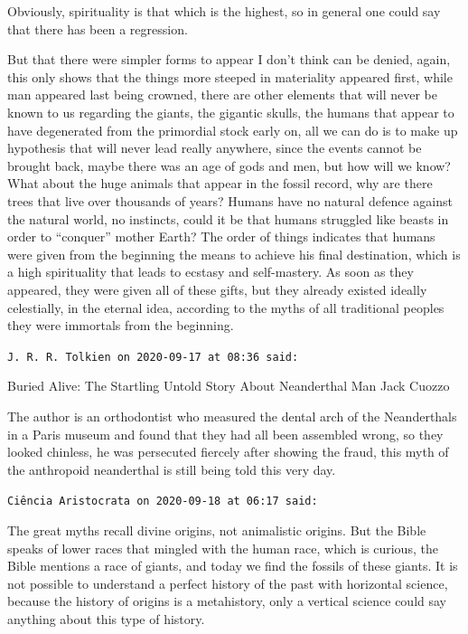 \begin{footnotesize}
\begin{sffamily}
Obviously, spirituality is that which is the highest, so in general one could say that there has been a regression.

But that there were simpler forms to appear I don't think can be denied, again, this only shows that the things more steeped in materiality appeared first, while man appeared last being crowned, there are other elements that will never be known to us regarding the giants, the gigantic skulls, the humans that appear to have degenerated from the primordial stock early on, all we can do is to make up hypothesis that will never lead really anywhere, since the events cannot be brought back, maybe there was an age of gods and men, but how will we know? What about the huge animals that appear in the fossil record, why are there trees that live over thousands of years? Humans have no natural defence against the natural world, no instincts, could it be that humans struggled like beasts in order to ``conquer'' mother Earth? The order of things indicates that humans were given from the beginning the means to achieve his final destination, which is a high spirituality that leads to ecstasy and self-mastery. As soon as they appeared, they were given all of these gifts, but they already existed ideally celestially, in the eternal idea, according to the myths of all traditional peoples they were immortals from the beginning.

\hfill

\texttt{J. R. R. Tolkien on 2020-09-17 at 08:36 said:}

Buried Alive: The Startling Untold Story About Neanderthal Man Jack Cuozzo

The author is an orthodontist who measured the dental arch of the Neanderthals in a Paris museum and found that they had all been assembled wrong, so they looked chinless, he was persecuted fiercely after showing the fraud, this myth of the anthropoid neanderthal is still being told this very day.

\hfill

\texttt{Ciência Aristocrata on 2020-09-18 at 06:17 said:}

The great myths recall divine origins, not animalistic origins. But the Bible speaks of lower races that mingled with the human race, which is curious, the Bible mentions a race of giants, and today we find the fossils of these giants. It is not possible to understand a perfect history of the past with horizontal science, because the history of origins is a metahistory, only a vertical science could say anything about this type of history.


\end{sffamily}
\end{footnotesize}
